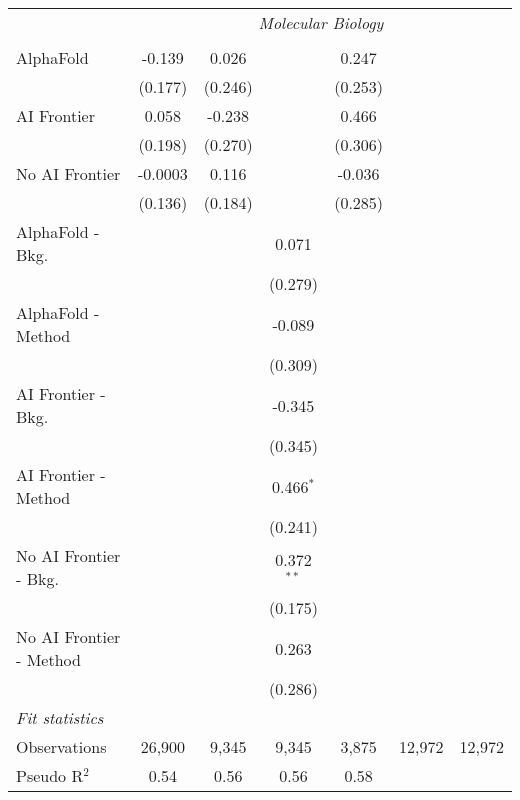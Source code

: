 \begin{tabular}{lcccccc}
 & \multicolumn{6}{c}{\textit{Molecular Biology}} \\ \\
   AlphaFold               & -0.139   & 0.026   &              & 0.247   &        &   \\   
                           & (0.177)  & (0.246) &              & (0.253) &        &   \\   
   AI Frontier             & 0.058    & -0.238  &              & 0.466   &        &   \\   
                           & (0.198)  & (0.270) &              & (0.306) &        &   \\   
   No AI Frontier          & -0.0003  & 0.116   &              & -0.036  &        &   \\   
                           & (0.136)  & (0.184) &              & (0.285) &        &   \\   
   AlphaFold - Bkg.        &          &         & 0.071        &         &        &   \\   
                           &          &         & (0.279)      &         &        &   \\   
   AlphaFold - Method      &          &         & -0.089       &         &        &   \\   
                           &          &         & (0.309)      &         &        &   \\   
   AI Frontier - Bkg.      &          &         & -0.345       &         &        &   \\   
                           &          &         & (0.345)      &         &        &   \\   
   AI Frontier - Method    &          &         & 0.466$^{*}$  &         &        &   \\   
                           &          &         & (0.241)      &         &        &   \\   
   No AI Frontier - Bkg.   &          &         & 0.372$^{**}$ &         &        &   \\   
                           &          &         & (0.175)      &         &        &   \\   
   No AI Frontier - Method &          &         & 0.263        &         &        &   \\   
                           &          &         & (0.286)      &         &        &   \\   
   \midrule
   \emph{Fit statistics}\\
   Observations            & 26,900   & 9,345   & 9,345        & 3,875   & 12,972 & 12,972\\  
   Pseudo R$^2$            & 0.54     & 0.56    & 0.56         & 0.58    &        & \\  
   

\end{tabular}
